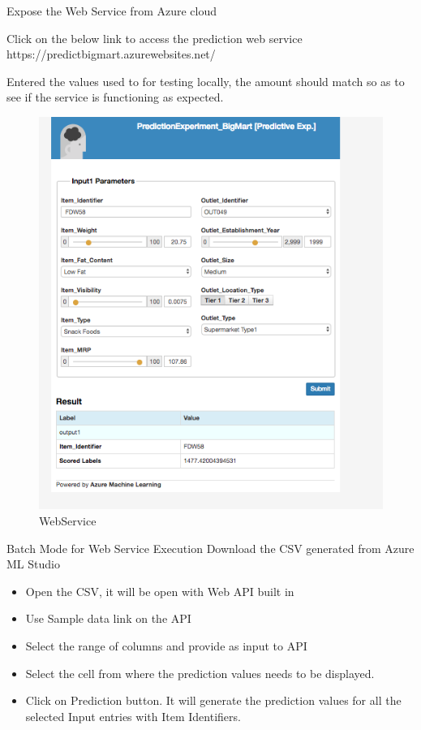 Expose the Web Service from Azure cloud

Click on the below link to access the prediction web service  
https://predictbigmart.azurewebsites.net/

Entered the values used to for testing locally, the amount should 
match so as to see if the service is functioning as expected.

\begin{figure}[pic8]
	\centering\includegraphics[width=\columnwidth]
{Images/mlstudio/WebService.png}
	\caption{WebService}\label{fig:WebService}
\end{figure}

Batch Mode for Web Service Execution
Download the CSV generated from Azure ML Studio 
\begin{itemize}
\item Open the CSV, it will be open with Web API built in
\item Use Sample data link on the API
\item Select the range of columns and provide as input to API
\item Select the cell from where the prediction values needs to be displayed.
\item Click on Prediction button.
It will generate the prediction values for all the selected Input entries 
with Item Identifiers.
\end{itemize}

